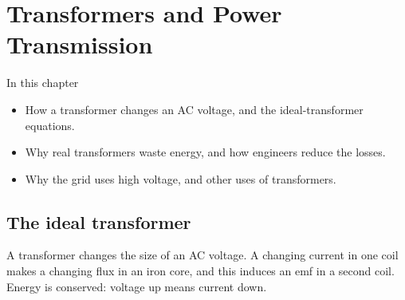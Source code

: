 \chapter{Transformers and Power Transmission}\label{ch4:chap}


\begin{summarybox}{In this chapter}
\begin{itemize}
  \item How a transformer changes an AC voltage, and the ideal-transformer equations.
  \item Why real transformers waste energy, and how engineers reduce the losses.
  \item Why the grid uses high voltage, and other uses of transformers.
\end{itemize}
\end{summarybox}

\section{The ideal transformer}\label{ch4:sec:ideal}

\begin{bigidea}
A transformer changes the size of an AC voltage. A changing current in one coil makes a
changing flux in an iron core, and this induces an emf in a second coil. Energy is
conserved: voltage up means current down.
\end{bigidea}

\begin{keywords}
\end{keywords}

